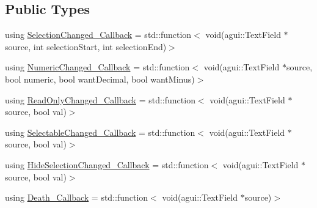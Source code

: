 \subsection*{Public Types}
\begin{DoxyCompactItemize}
\item 
using \mbox{\hyperlink{classec_1_1_generic_text_field_listener_aa25985c5297422833dc4f5395562f238}{Selection\+Changed\+\_\+\+Callback}} = std\+::function$<$ void(agui\+::\+Text\+Field $\ast$source, int selection\+Start, int selection\+End)$>$
\item 
using \mbox{\hyperlink{classec_1_1_generic_text_field_listener_a812d274699c302784f844242b07b4f0b}{Numeric\+Changed\+\_\+\+Callback}} = std\+::function$<$ void(agui\+::\+Text\+Field $\ast$source, bool numeric, bool want\+Decimal, bool want\+Minus)$>$
\item 
using \mbox{\hyperlink{classec_1_1_generic_text_field_listener_aca96f31990936c2284b510bc4636b08b}{Read\+Only\+Changed\+\_\+\+Callback}} = std\+::function$<$ void(agui\+::\+Text\+Field $\ast$source, bool val)$>$
\item 
using \mbox{\hyperlink{classec_1_1_generic_text_field_listener_afa761f962b7fb681d7d9d29a132f800e}{Selectable\+Changed\+\_\+\+Callback}} = std\+::function$<$ void(agui\+::\+Text\+Field $\ast$source, bool val)$>$
\item 
using \mbox{\hyperlink{classec_1_1_generic_text_field_listener_a1a1f11d8e8c473760260f7ed5cacb458}{Hide\+Selection\+Changed\+\_\+\+Callback}} = std\+::function$<$ void(agui\+::\+Text\+Field $\ast$source, bool val)$>$
\item 
using \mbox{\hyperlink{classec_1_1_generic_text_field_listener_a720d56c97f2ac11e2658db516b186d4f}{Death\+\_\+\+Callback}} = std\+::function$<$ void(agui\+::\+Text\+Field $\ast$source)$>$
\end{DoxyCompactItemize}
